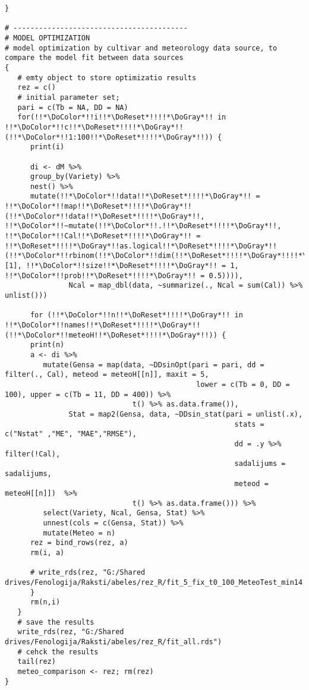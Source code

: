\begin{verbatim}
}

# -----------------------------------------
# MODEL OPTIMIZATION
# model optimization by cultivar and meteorology data source, to compare the model fit between data sources
{
   # emty object to store optimizatio results
   rez = c()
   # initial parameter set;
   pari = c(Tb = NA, DD = NA)
   for(!!*\DoColor*!!i!!*\DoReset*!!!!*\DoGray*!! in !!*\DoColor*!!c!!*\DoReset*!!!!*\DoGray*!!(!!*\DoColor*!!1:100!!*\DoReset*!!!!*\DoGray*!!)) {
      print(i)

      di <- dM %>%
      group_by(Variety) %>%
      nest() %>%
      mutate(!!*\DoColor*!!data!!*\DoReset*!!!!*\DoGray*!! = !!*\DoColor*!!map!!*\DoReset*!!!!*\DoGray*!!(!!*\DoColor*!!data!!*\DoReset*!!!!*\DoGray*!!, !!*\DoColor*!!~mutate(!!*\DoColor*!!.!!*\DoReset*!!!!*\DoGray*!!, !!*\DoColor*!!Cal!!*\DoReset*!!!!*\DoGray*!! = !!*\DoReset*!!!!*\DoGray*!!as.logical!!*\DoReset*!!!!*\DoGray*!!(!!*\DoColor*!!rbinom(!!*\DoColor*!!dim(!!*\DoReset*!!!!*\DoGray*!!!!*\DoReset*!!!!*\DoGray*!!.!!*\DoReset*!!!!*\DoGray*!!)[1], !!*\DoColor*!!size!!*\DoReset*!!!!*\DoGray*!! = 1, !!*\DoColor*!!prob!!*\DoReset*!!!!*\DoGray*!! = 0.5)))),
               Ncal = map_dbl(data, ~summarize(., Ncal = sum(Cal)) %>% unlist()))

      for (!!*\DoColor*!!n!!*\DoReset*!!!!*\DoGray*!! in !!*\DoColor*!!names!!*\DoReset*!!!!*\DoGray*!!(!!*\DoColor*!!meteoH!!*\DoReset*!!!!*\DoGray*!!)) {
      print(n)
      a <- di %>%
         mutate(Gensa = map(data, ~DDsinOpt(pari = pari, dd = filter(., Cal), meteod = meteoH[[n]], maxit = 5,
                                             lower = c(Tb = 0, DD = 100), upper = c(Tb = 11, DD = 400)) %>%
                              t() %>% as.data.frame()),
               Stat = map2(Gensa, data, ~DDsin_stat(pari = unlist(.x),
                                                      stats = c("Nstat" ,"ME", "MAE","RMSE"),
                                                      dd = .y %>% filter(!Cal),
                                                      sadalijums = sadalijums,
                                                      meteod = meteoH[[n]])  %>%
                              t() %>% as.data.frame())) %>%
         select(Variety, Ncal, Gensa, Stat) %>%
         unnest(cols = c(Gensa, Stat)) %>%
         mutate(Meteo = n)
      rez = bind_rows(rez, a)
      rm(i, a)

      # write_rds(rez, "G:/Shared drives/Fenologija/Raksti/abeles/rez_R/fit_5_fix_t0_100_MeteoTest_min14.rds")
      }
      rm(n,i)
   }
   # save the results
   write_rds(rez, "G:/Shared drives/Fenologija/Raksti/abeles/rez_R/fit_all.rds")
   # cehck the results
   tail(rez)
   meteo_comparison <- rez; rm(rez)
}


\end{verbatim}
